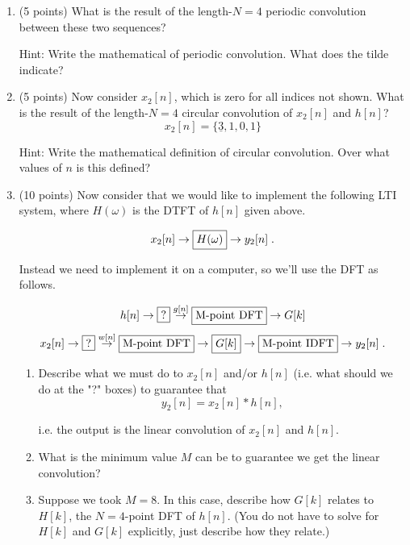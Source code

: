 \documentclass[]{siamltex}
\begin{document}
\begin{enumerate}
	\begin{enumerate} 
	\item (5 points) What is the result of the length-$N=4$ periodic convolution between these two sequences?
	
	Hint: Write the mathematical of periodic convolution. What does the tilde indicate?
	
	\vspace{3in}
	\item (5 points) Now consider $x_2[n]$, which is zero for all indices not shown. What is the result of the length-$N=4$ circular convolution of $x_2[n]$ and $h[n]$?
	\[ x_2[n] = \{\underline{3},1,0,1 \} \]
	
	Hint: Write the mathematical definition of circular convolution. Over what values of $n$ is this defined? 
	
	
	\newpage
	\item (10 points) Now consider that we would like to implement the following LTI system, where $H(\omega)$ is the DTFT of $h[n]$ given above.
	
	$$x_2[n]  \rightarrow \fbox{$H(\omega)$} \rightarrow y_2[n]\;.$$
	
	Instead we need to implement it on a computer, so we'll use the DFT as follows. 
	
	$$h[n] \rightarrow \fbox{?} \stackrel{g[n]}{\rightarrow} \fbox{M-point DFT} \rightarrow G[k] $$		
	$$x_2[n] \rightarrow \fbox{?} \stackrel{w[n]}{\rightarrow}  \fbox{M-point DFT}  \rightarrow \fbox{$G[k]$}\rightarrow  \fbox{M-point IDFT}  \rightarrow y_2[n]\;.$$
	
		\begin{enumerate} 
		\item Describe what we must do to $x_2[n]$ and/or $h[n]$ (i.e. what should we do at the "?" boxes) to guarantee that $$y_2[n] = x_2[n]*h[n],$$ 
		
		i.e. the output is the linear convolution of $x_2[n]$ and  $h[n]$.
		
		\vspace{1in} 
		\item What is the minimum value $M$ can be to guarantee we get the linear convolution?
		
		\vspace{.5in}
		\item Suppose we took $M=8$. In this case, describe how $G[k]$ relates to $H[k]$, the $N=4$-point DFT of $h[n]$. (You do not have to solve for $H[k]$ and $G[k]$ explicitly, just describe how they relate.)
		

\end{enumerate}
\end{enumerate}
\end{enumerate}
\end{document}
